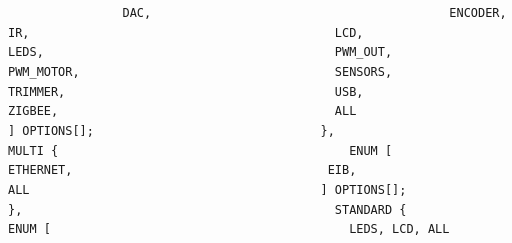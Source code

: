 {{{{{\lstinline!                DAC,                         ! \newline
\lstinline!                ENCODER,                     ! \newline
\lstinline!                IR,                          ! \newline
\lstinline!                LCD,                         ! \newline
\lstinline!                LEDS,                        ! \newline
\lstinline!                PWM_OUT,                     ! \newline
\lstinline!                PWM_MOTOR,                   ! \newline
\lstinline!                SENSORS,                     ! \newline
\lstinline!                TRIMMER,                     ! \newline
\lstinline!                USB,                         ! \newline
\lstinline!                ZIGBEE,                      ! \newline
\newline					
\lstinline!                ALL                          ! \newline
\lstinline!              ] OPTIONS[];                   ! \newline
\lstinline!            },                               ! \newline
\lstinline!            MULTI {                          ! \newline
\lstinline!              ENUM [                         ! \newline
\lstinline!                 ETHERNET,                   ! \newline
\lstinline!                EIB,                         ! \newline
\lstinline!                ALL                          ! \newline
\lstinline!              ] OPTIONS[];                   ! \newline
\lstinline!            },                               ! \newline
\lstinline!            STANDARD {                       ! \newline
\lstinline!              ENUM [                         ! \newline
\lstinline!                LEDS, LCD, ALL               ! \newline
}}}}}

